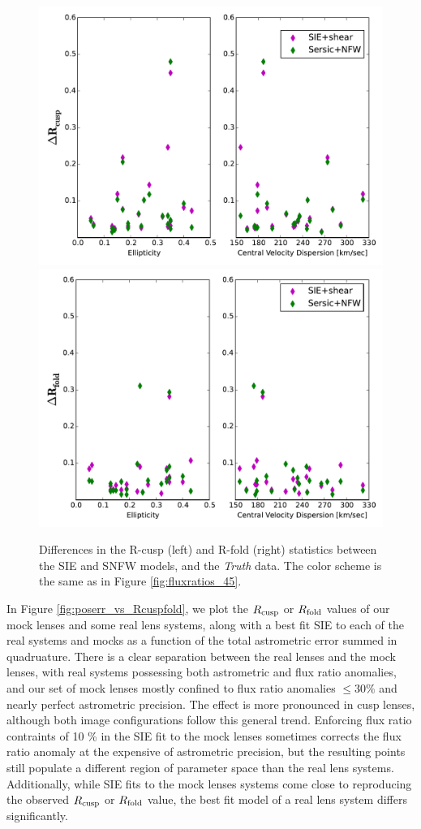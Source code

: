 \begin{figure}
	{\includegraphics[trim=0cm 0.2cm 0cm 0.2cm,clip,width=.48\textwidth]{./figures_sls/EllipVdis_vs_Rcusp-eps-converted-to.pdf}}
	{\includegraphics[trim=0cm 0.2cm 0cm 0.2cm,clip,width=.48\textwidth]{./figures_sls/EllipVdis_vs_Rfold-eps-converted-to.pdf}} 
	\caption[$R_{\rm{cusp}}$ and $R_{\rm{fold}}$ statistics for the fits versus the \textit{Truth} model]{\label{fig:Rcuspfold_plot}Differences in the R-cusp (left) and R-fold (right) statistics between the SIE and SNFW models, and the \textit{Truth} data. The color scheme is the same as in Figure \ref{fig:fluxratios_45}.}
\end{figure}
\newline \indent In Figure \ref{fig:poserr_vs_Rcuspfold}, we plot the $R_{\rm{cusp}}$ or $R_{\rm{fold}}$ values of our mock lenses and some real lens systems, along with a best fit SIE to each of the real systems and mocks as a function of the total astrometric error summed in quadruature. There is a clear separation between the real lenses and the mock lenses, with real systems possessing both astrometric and flux ratio anomalies, and our set of mock lenses mostly confined to flux ratio anomalies $\leq 30 \%$ and nearly perfect astrometric precision. The effect is more pronounced in cusp lenses, although both image configurations follow this general trend. Enforcing flux ratio contraints of 10 \% in the SIE fit to the mock lenses sometimes corrects the flux ratio anomaly at the expensive of astrometric precision, but the resulting points still populate a different region of parameter space than the real lens systems. Additionally, while SIE fits to the mock lenses systems come close to reproducing the observed $R_{\rm{cusp}}$ or $R_{\rm{fold}}$ value, the best fit model of a real lens system differs significantly.

